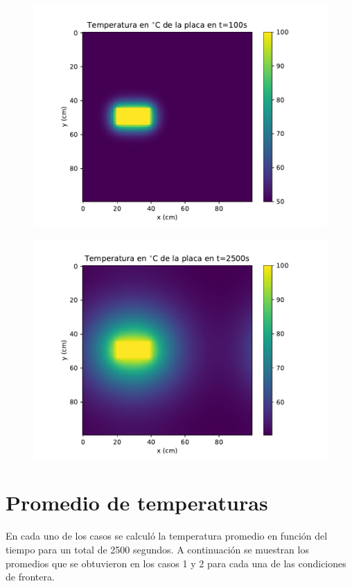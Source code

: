 \documentclass[12pt,letterpaper]{article}
\begin{document}
\begin{figure}[H]
\includegraphics{p2_100.pdf}
\centering
\end{figure}

\begin{figure}[H]
\includegraphics{p2_2500.pdf}
\centering
\end{figure}

\section*{Promedio de temperaturas}

En cada uno de los casos se calculó la temperatura promedio en función del tiempo para un total de 2500 segundos. A continuación se muestran los promedios que se obtuvieron en los casos 1 y 2 para cada una de las condiciones de frontera.
\end{document}
